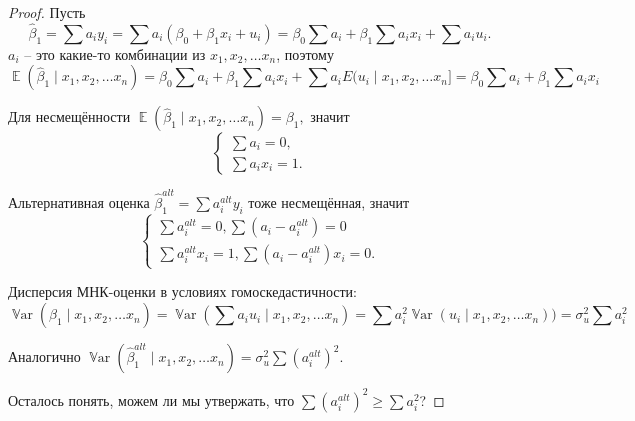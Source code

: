 \documentclass[12pt]{article}
\DeclareMathOperator{\Var}{\mathbb{V}ar}
\DeclareMathOperator{\E}{\mathbb{E}}
\newcommand{\hb}{\hat{\beta}}
\begin{document}
\begin{proof}
    Пусть \[ \hb_1 = \sum a_i y_i = \sum a_i (\beta_0 + \beta_1 x_i + u_i) 
    = \beta_0 \sum a_i + \beta_1 \sum a_i x_i + \sum a_i u_i.\]
    $a_i$ -- это какие-то комбинации из $x_1, x_2, \ldots x_n$, поэтому      
    \[\E(\hb_1 \mid x_1, x_2, \ldots x_n) = \beta_0 \sum a_i + \beta_1 \sum a_i x_i + \sum a_i E(u_i \mid x_1, x_2, \ldots x_n] = \beta_0 \sum a_i + \beta_1 \sum a_i x_i \]

    Для несмещённости \( \E(\hb_1 \mid x_1, x_2, \ldots x_n) = \beta_1, \) значит 
    \[
    \begin{cases}
        \sum a_i = 0, \\
        \sum a_i x_i = 1.
    \end{cases}
    \]

    Альтернативная оценка $\hb_1^{alt} = \sum a_i^{alt} y_i$ тоже несмещённая, значит
    \[
    \begin{cases}
        \sum a_i^{alt} = 0, \sum (a_i - a_i^{alt}) = 0\\
        \sum a_i^{alt} x_i = 1, \sum (a_i - a_i^{alt}) x_i = 0.
    \end{cases}
    \]

    Дисперсия МНК-оценки в условиях гомоскедастичности:
    \[\Var(\hb_1 \mid x_1, x_2, \ldots x_n) = \Var\left( \sum a_i u_i \mid x_1, x_2, \ldots x_n \right) = \sum a_i^2 \Var(u_i \mid x_1, x_2, \ldots x_n)) = \sigma_u^2 \sum a_i^2
    \]

    Аналогично \(\Var( \hb_1^{alt} \mid x_1, x_2, \ldots x_n) = \sigma_u^2 \sum (a_i^{alt})^2.\)

    Осталось понять, можем ли мы утвержать, что \( \sum (a_i^{alt})^2 \ge \sum a_i^2\)?

\end{proof}
\end{document}
